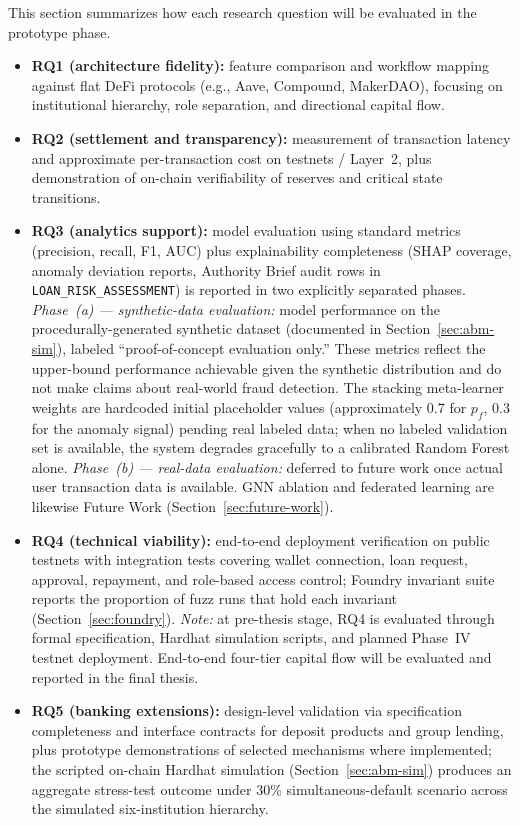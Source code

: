 \documentclass[12pt,a4paper]{report}
\begin{document}
This section summarizes how each research question will be evaluated in the prototype phase.
\begin{itemize}[noitemsep]
\item \textbf{RQ1 (architecture fidelity):} feature comparison and workflow mapping against flat DeFi protocols (e.g., Aave, Compound, MakerDAO), focusing on institutional hierarchy, role separation, and directional capital flow.
\item \textbf{RQ2 (settlement and transparency):} measurement of transaction latency and approximate per-transaction cost on testnets / Layer~2, plus demonstration of on-chain verifiability of reserves and critical state transitions.
\item \textbf{RQ3 (analytics support):} model evaluation using standard metrics (precision, recall, F1, AUC) plus explainability completeness (SHAP coverage, anomaly deviation reports, Authority Brief audit rows in \texttt{LOAN\_RISK\_ASSESSMENT}) is reported in two explicitly separated phases. \textit{Phase~(a) --- synthetic-data evaluation:} model performance on the procedurally-generated synthetic dataset (documented in Section~\ref{sec:abm-sim}), labeled ``proof-of-concept evaluation only.'' These metrics reflect the upper-bound performance achievable given the synthetic distribution and do not make claims about real-world fraud detection. The stacking meta-learner weights are hardcoded initial placeholder values (approximately 0.7 for $p_f$, 0.3 for the anomaly signal) pending real labeled data; when no labeled validation set is available, the system degrades gracefully to a calibrated Random Forest alone. \textit{Phase~(b) --- real-data evaluation:} deferred to future work once actual user transaction data is available. GNN ablation and federated learning are likewise Future Work (Section~\ref{sec:future-work}).
\item \textbf{RQ4 (technical viability):} end-to-end deployment verification on public testnets with integration tests covering wallet connection, loan request, approval, repayment, and role-based access control; Foundry invariant suite reports the proportion of fuzz runs that hold each invariant (Section~\ref{sec:foundry}). \textit{Note:} at pre-thesis stage, RQ4 is evaluated through formal specification, Hardhat simulation scripts, and planned Phase~IV testnet deployment. End-to-end four-tier capital flow will be evaluated and reported in the final thesis.
\item \textbf{RQ5 (banking extensions):} design-level validation via specification completeness and interface contracts for deposit products and group lending, plus prototype demonstrations of selected mechanisms where implemented; the scripted on-chain Hardhat simulation (Section~\ref{sec:abm-sim}) produces an aggregate stress-test outcome under 30\% simultaneous-default scenario across the simulated six-institution hierarchy.
\end{itemize}
\end{document}

